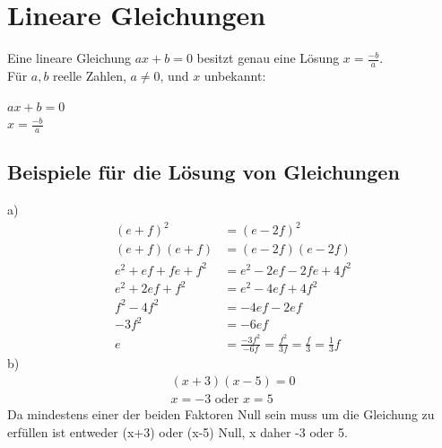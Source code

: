 \documentclass[a4paper]{article}
\begin{document}
\section{Lineare Gleichungen}
Eine lineare Gleichung $ax+b=0$ besitzt genau eine Lösung $x = \frac{-b}{a}$. \\ Für $a,b$ reelle Zahlen, $a\neq 0$, und $x$ unbekannt:
\begin{center} $ax+b=0$\\
$x = \frac{-b}{a}$
\end{center}

\subsection{Beispiele für die Lösung von Gleichungen}
a)
\begin{align*}
(e+f)^{2} &= (e-2f)^{2} \\
(e+f)(e+f) &= (e-2f)(e-2f) \\
e^{2}+ef+fe+f^{2} &= e^{2}-2ef-2fe+4f^{2} \\
e^{2}+2ef+f^{2} &= e^{2}-4ef+4f^{2} \\
f^{2}-4f^{2} &= -4ef - 2ef \\
-3f^{2} &= -6ef \\
e &= \frac{-3f^{2}}{-6f} = \frac{f^{2}}{3f} = \frac{f}{3} = \frac{1}{3}f
\end{align*}
b)
\begin{align*}
(x+3)(x-5)=0 \\
x=-3 \text{ oder } x=5
\end{align*}
Da mindestens einer der beiden Faktoren Null sein muss um die Gleichung zu erfüllen ist entweder (x+3) oder (x-5) Null, x daher -3 oder 5.
\end{document}
